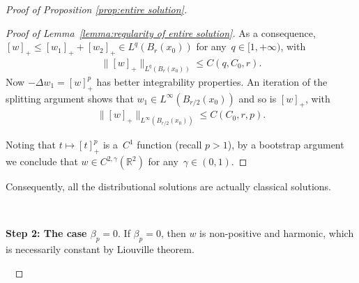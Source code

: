 \documentclass[10pt]{amsart}
\newcommand{\R}{\mathbb{R}}
\def\R{\mathbb{R}}
\begin{document}
\begin{proof}[Proof of Proposition \ref{prop:entire solution}]
\begin{proof}[Proof of Lemma~\ref{lemma:regularity of entire solution}]
        As a consequence,~$[w]_+\leq [w_1]_+ + [w_2]_+ \in L^q(B_r(x_0))$ for any~$q\in [1,+\infty)$, with
        \begin{align*}
            \|[w]_+\|_{L^q(B_r(x_0))} \leq C(q,C_0,r).
        \end{align*}
        Now $-\Delta w_1=[w]_+^p$ has better integrability properties.
        An iteration of the splitting argument shows that $w_1\in L^\infty(B_{r/2}(x_0))$ and so is $[w]_+$, with
        \begin{align*}
            \|[w]_+\|_{L^\infty(B_{r/2}(x_0))} \leq C(C_0,r,p).
        \end{align*}

        Noting that $t\mapsto [t]_+^p$ is a~$C^1$ function (recall $p>1$), by a bootstrap argument we conclude that
        $w\in C^{2,\gamma}(\R^2)$ for any~$\gamma\in (0,1)$.
    \end{proof}

    Consequently, all the distributional solutions are actually classical solutions.

    \

    {\bf Step 2: The case $\beta_p=0$}.
    If $\beta_p=0$, then $w$ is non-positive and harmonic, which is necessarily constant by Liouville theorem.

    \




\end{proof}
\end{document}
